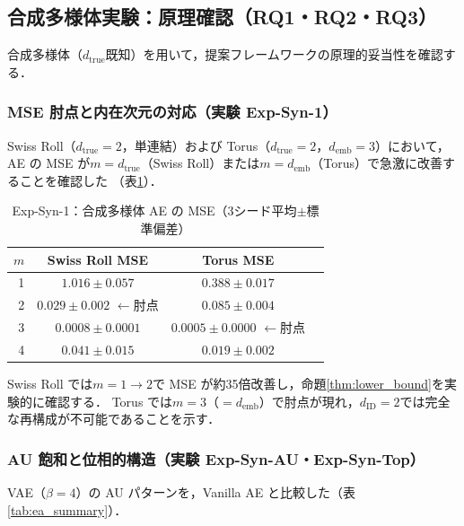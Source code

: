 \documentclass[11pt,a4paper]{jsarticle}
\newcommand{\dID}{d_{\mathrm{ID}}}
\newcommand{\dtrue}{d_{\mathrm{true}}}
\newcommand{\demb}{d_{\mathrm{emb}}}
\begin{document}
\subsection{合成多様体実験：原理確認（RQ1・RQ2・RQ3）}\label{sec:exp_synthetic}

合成多様体（$\dtrue$既知）を用いて，提案フレームワークの原理的妥当性を確認する．

\subsubsection{MSE 肘点と内在次元の対応（実験 Exp-Syn-1）}

Swiss Roll（$\dtrue = 2$，単連結）および Torus（$\dtrue = 2$，$\demb = 3$）において，
AE の MSE が$m = \dtrue$（Swiss Roll）または$m = \demb$（Torus）で急激に改善することを確認した
（表\ref{tab:e1}）．

\begin{table}[H]
\centering
\caption{Exp-Syn-1：合成多様体 AE の MSE（3シード平均$\pm$標準偏差）}
\label{tab:e1}
\small
\begin{tabular}{rccc}
\toprule
$m$ & Swiss Roll MSE & Torus MSE \\
\midrule
1 & $1.016\pm0.057$ & $0.388\pm0.017$ \\
2 & $\boldsymbol{0.029\pm0.002}$ $\leftarrow$肘点 & $0.085\pm0.004$ \\
3 & $0.0008\pm0.0001$ & $\boldsymbol{0.0005\pm0.0000}$ $\leftarrow$肘点 \\
4 & $0.041\pm0.015$ & $0.019\pm0.002$ \\
\bottomrule
\end{tabular}
\end{table}

Swiss Roll では$m = 1 \to 2$で MSE が約35倍改善し，命題\ref{thm:lower_bound}を実験的に確認する．
Torus では$m = 3$（$= \demb$）で肘点が現れ，$\dID = 2$では完全な再構成が不可能であることを示す．

\subsubsection{AU 飽和と位相的構造（実験 Exp-Syn-AU・Exp-Syn-Top）}

VAE（$\beta = 4$）の AU パターンを，Vanilla AE と比較した（表\ref{tab:ea_summary}）．
\end{document}
